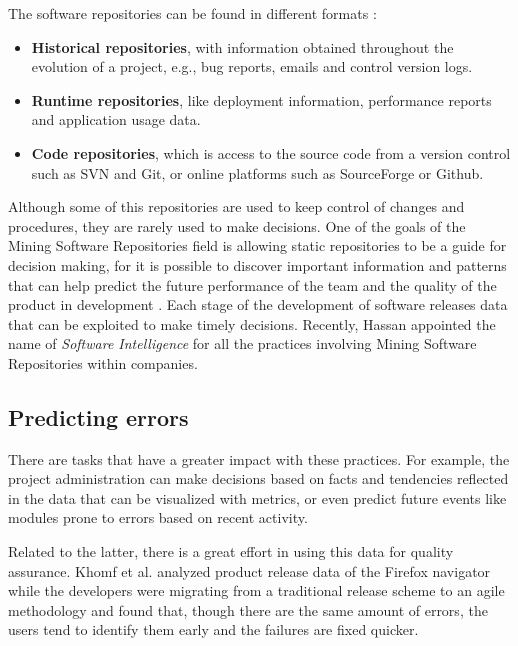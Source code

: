 The software repositories can be found in different formats \cite{H08}:
\begin{itemize}
	\item \textbf{Historical repositories}, with information obtained throughout the evolution of a project, e.g., bug reports, emails and control version logs.
	\item \textbf{Runtime repositories}, like deployment information, performance reports and application usage data.
	\item \textbf{Code repositories}, which is access to the source code from a version control such as SVN and Git, or online platforms such as SourceForge or Github.
\end{itemize}

Although some of this repositories are used to keep control of changes and procedures, they are rarely used to make decisions. One of the goals of the Mining Software Repositories field is allowing static repositories to be a guide for decision making, for it is possible to discover important information and patterns that can help predict the future performance of the team and the quality of the product in development \cite{H08, ZZW05}. Each stage of the development of software releases data that can be exploited to make timely decisions. Recently, Hassan \cite{HX10} appointed the name of \emph{Software Intelligence} for all the practices involving Mining Software Repositories within companies.

\subsection{Predicting errors}
There are tasks that have a greater impact with these practices. For example, the project administration can make decisions based on facts and tendencies reflected in the data that can be visualized with metrics, or even predict future events like modules prone to errors based on recent activity.

Related to the latter, there is a great effort in using this data for quality assurance. Khomf et al. \cite{KDZ12} analyzed product release data of the Firefox navigator while the developers were migrating from a traditional release scheme to an agile methodology and found that, though there are the same amount of errors, the users tend to identify them early and the failures are fixed quicker.

